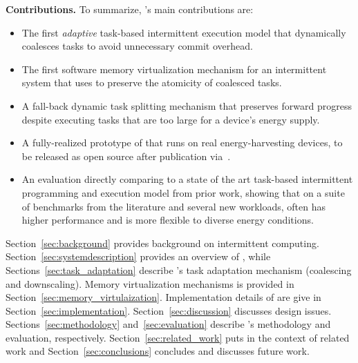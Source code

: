 \textbf{Contributions.} To summarize, \sys's main contributions are: 

\begin{itemize}
\item The first {\em adaptive} task-based intermittent execution model that dynamically coalesces tasks to avoid unnecessary commit overhead. 
\item The first software memory virtualization mechanism for an intermittent system that \sys uses to preserve the atomicity of coalesced tasks.
\item A fall-back dynamic task splitting mechanism that preserves forward progress despite executing tasks that are too large for a device's energy supply.
\item A fully-realized prototype of \sys that runs on real energy-harvesting devices, to be released as open source after publication via~\cite{coala_website}. 
\item An evaluation directly comparing \sys to a state of the art task-based intermittent programming and execution model from prior work, showing that on a suite of benchmarks from the literature and several new workloads, \sys often has higher performance and is more flexible to diverse energy conditions. 
\end{itemize}

Section~\ref{sec:background} provides background on intermittent computing.
Section~\ref{sec:systemdescription} provides an overview of \sys, while
Sections~\ref{sec:task_adaptation} describe \sys's task adaptation mechanism (coalescing and downscaling). Memory virtualization mechanisms is provided in Section~\ref{sec:memory_virtulaization}. Implementation details of \sys are give in Section~\ref{sec:implementation}. Section~\ref{sec:discussion} discusses \sys
design issues. Sections~\ref{sec:methodology} and~\ref{sec:evaluation} describe
\sys's methodology and evaluation, respectively. Section~\ref{sec:related_work} puts \sys in the
context of related work and Section~\ref{sec:conclusions} concludes and discusses
future work.
